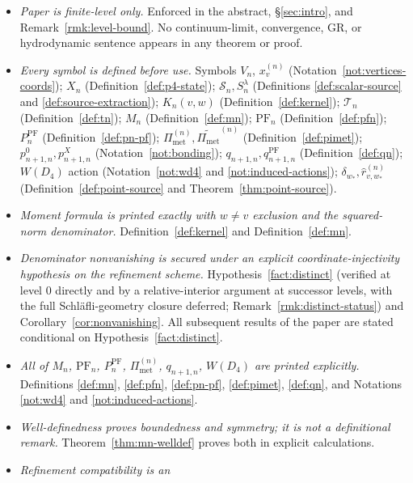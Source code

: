 \documentclass[11pt, a4paper]{amsart}
\theoremstyle{definition}
\newcommand{\Met}{\mathrm{met}}
\newcommand{\PF}{\mathrm{PF}}
\newcommand{\Pimet}{\Pi_{\Met}}
\begin{document}
\begin{itemize}
\item[\textbf{[1]}] \emph{Paper is finite-level only.} Enforced
  in the abstract, \S\ref{sec:intro}, and
  Remark~\ref{rmk:level-bound}. No continuum-limit, convergence,
  GR, or hydrodynamic sentence appears in any theorem or proof.
\item[\textbf{[2]}] \emph{Every symbol is defined before use.}
  Symbols $V_n$, $x_v^{(n)}$ (Notation~\ref{not:vertices-coords});
  $X_n$ (Definition~\ref{def:p4-state}); $\mathcal S_n, S_n^\lambda$
  (Definitions \ref{def:scalar-source} and
  \ref{def:source-extraction}); $K_n(v, w)$
  (Definition~\ref{def:kernel}); $\mathcal T_n$
  (Definition~\ref{def:tn}); $M_n$ (Definition~\ref{def:mn});
  $\PF_n$ (Definition~\ref{def:pfn}); $P_n^\PF$
  (Definition~\ref{def:pn-pf}); $\Pimet^{(n)},
  \widetilde{\Pimet}^{(n)}$ (Definition~\ref{def:pimet});
  $p_{n+1, n}^0, p_{n+1, n}^X$ (Notation~\ref{not:bonding});
  $q_{n+1, n}, q_{n+1, n}^\PF$ (Definition~\ref{def:qn});
  $W(D_4)$ action (Notation~\ref{not:wd4} and
  \ref{not:induced-actions}); $\delta_{w_\ast},
  \hat r_{v, w_\ast}^{(n)}$ (Definition~\ref{def:point-source}
  and Theorem~\ref{thm:point-source}).
\item[\textbf{[3]}] \emph{Moment formula is printed exactly with
  $w \neq v$ exclusion and the squared-norm denominator.}
  Definition~\ref{def:kernel} and Definition~\ref{def:mn}.
\item[\textbf{[4]}] \emph{Denominator nonvanishing is secured under
  an explicit coordinate-injectivity hypothesis on the refinement
  scheme.} Hypothesis~\ref{fact:distinct} (verified at level $0$
  directly and by a relative-interior argument at successor levels,
  with the full Schl\"afli-geometry closure deferred;
  Remark~\ref{rmk:distinct-status}) and
  Corollary~\ref{cor:nonvanishing}. All subsequent results of the
  paper are stated conditional on
  Hypothesis~\ref{fact:distinct}.
\item[\textbf{[5]}] \emph{All of $M_n$, $\PF_n$, $P_n^\PF$,
  $\Pimet^{(n)}$, $q_{n+1, n}$, $W(D_4)$ are printed
  explicitly.} Definitions \ref{def:mn}, \ref{def:pfn},
  \ref{def:pn-pf}, \ref{def:pimet}, \ref{def:qn}, and
  Notations \ref{not:wd4} and \ref{not:induced-actions}.
\item[\textbf{[6]}] \emph{Well-definedness proves boundedness
  and symmetry; it is not a definitional remark.}
  Theorem~\ref{thm:mn-welldef} proves both in explicit
  calculations.
\item[\textbf{[7]}] \emph{Refinement compatibility is an
}
\end{itemize}
\end{document}
